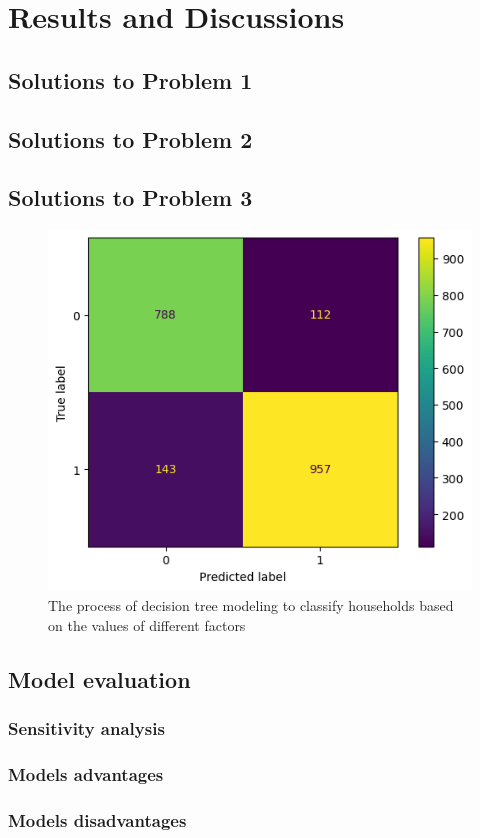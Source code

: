 \section{Results and Discussions}


\subsection{Solutions to Problem 1}



\subsection{Solutions to Problem 2}



\subsection{Solutions to Problem 3}


\begin{figure}[H]
	\centering
	\includegraphics[width = 0.9\linewidth]{figures/confusionMatrix.png}
	\caption{The process of decision tree modeling to classify households based on the values of different factors} 
	\label{fig: 4.1.1}
\end{figure}

\subsection{Model evaluation}



\subsubsection{Sensitivity analysis}



\subsubsection{Models advantages}




\subsubsection{Models disadvantages}